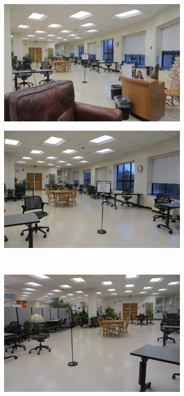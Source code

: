 \documentclass[12pt]{article} %
\begin{document}
\begin{figure}[H]
\begin{subfigure}{.5\linewidth}
\centering
\includegraphics[width=0.75\linewidth]{WC1}
\caption{}
\label{fig:WC1}
\end{subfigure}%
\begin{subfigure}{.5\linewidth}
\centering
\includegraphics[width=0.75\linewidth]{WC2}
\caption{}
\label{fig:WC2}
\end{subfigure}\\[1ex]
\begin{subfigure}{.5\linewidth}
\centering
\includegraphics[width=0.75\linewidth]{WC3}
\caption{}

\end{subfigure}
\end{figure}
\end{document}
